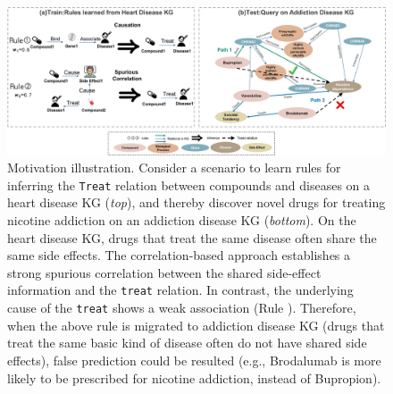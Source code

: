 \begin{figure}[t]
\centering
\includegraphics[width=16cm]{submissions/causal-meta-knowledge/figures/intro_case_v2.jpg}
\caption{Motivation illustration. Consider a scenario to learn rules for inferring the \texttt{Treat} relation between compounds and diseases on a heart disease KG (\emph{top}), and thereby discover novel drugs for treating nicotine addiction on an addiction disease KG (\emph{bottom}).
On the heart disease KG, drugs that treat the same disease often share the same side effects. The correlation-based approach establishes a strong spurious correlation between the shared side-effect information and the \texttt{treat} relation. In contrast, the underlying cause of the \texttt{treat} shows a weak association (Rule ).
Therefore, when the above rule is migrated to addiction disease KG (drugs that treat the same basic kind of disease often do not have shared side effects), false prediction could be resulted (e.g., Brodalumab is more likely to be prescribed for nicotine addiction, instead of Bupropion).}
\label{fig:rule_example}
\end{figure}

